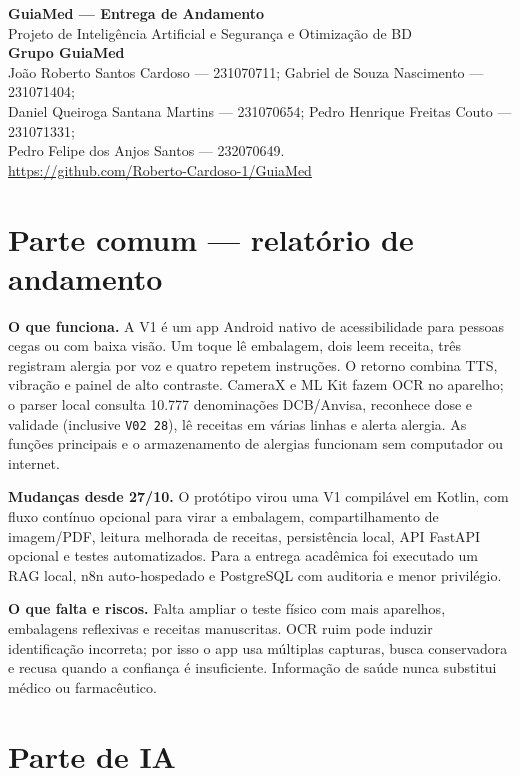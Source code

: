\documentclass[10pt,a4paper]{article}
\begin{document}
\begin{center}
{\Large\textbf{GuiaMed --- Entrega de Andamento}}\\[0.25em]
{\small Projeto de Inteligência Artificial e Segurança e Otimização de BD}\\[0.45em]
\textbf{Grupo GuiaMed}\\
\small João Roberto Santos Cardoso --- 231070711; Gabriel de Souza Nascimento --- 231071404;\\
Daniel Queiroga Santana Martins --- 231070654; Pedro Henrique Freitas Couto --- 231071331;\\
Pedro Felipe dos Anjos Santos --- 232070649.\\[0.25em]
\url{https://github.com/Roberto-Cardoso-1/GuiaMed}
\end{center}

\section*{Parte comum --- relatório de andamento}

\textbf{O que funciona.} A V1 é um app Android nativo de acessibilidade para pessoas cegas ou com baixa visão. Um toque lê embalagem, dois leem receita, três registram alergia por voz e quatro repetem instruções. O retorno combina TTS, vibração e painel de alto contraste. CameraX e ML Kit fazem OCR no aparelho; o parser local consulta 10.777 denominações DCB/Anvisa, reconhece dose e validade (inclusive \texttt{V02 28}), lê receitas em várias linhas e alerta alergia. As funções principais e o armazenamento de alergias funcionam sem computador ou internet.

\textbf{Mudanças desde 27/10.} O protótipo virou uma V1 compilável em Kotlin, com fluxo contínuo opcional para virar a embalagem, compartilhamento de imagem/PDF, leitura melhorada de receitas, persistência local, API FastAPI opcional e testes automatizados. Para a entrega acadêmica foi executado um RAG local, n8n auto-hospedado e PostgreSQL com auditoria e menor privilégio.

\textbf{O que falta e riscos.} Falta ampliar o teste físico com mais aparelhos, embalagens reflexivas e receitas manuscritas. OCR ruim pode induzir identificação incorreta; por isso o app usa múltiplas capturas, busca conservadora e recusa quando a confiança é insuficiente. Informação de saúde nunca substitui médico ou farmacêutico.

\section*{Parte de IA}
\end{document}
